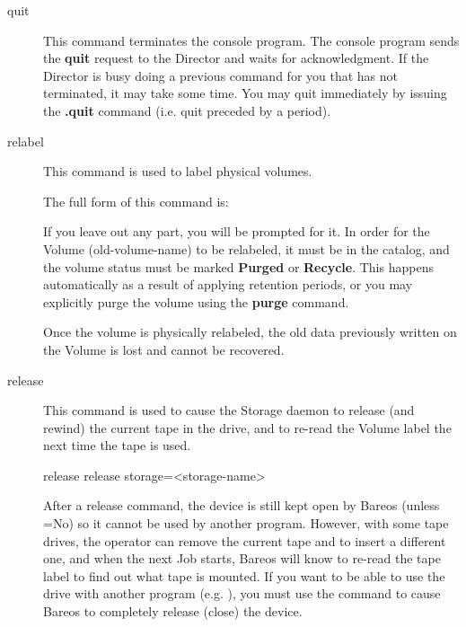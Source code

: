 \begin{description}
\item [quit]
   This command terminates the console program. The  console program sends the
   {\bf quit} request to the Director  and waits for acknowledgment. If the
   Director is busy doing  a previous command for you that has not terminated, it
   may  take some time. You may quit immediately by issuing the  {\bf .quit}
   command (i.e. quit preceded by a period).

\item [relabel]
   This command is used to label physical volumes.

   The full form of this command is:

\begin{bconsole}{relabel}
relabel storage=<storage-name> oldvolume=<old-volume-name> volume=<newvolume-name>}
\end{bconsole}

   If you leave out any part, you will be prompted for it.  In order for
   the Volume (old-volume-name) to be relabeled, it must be in the catalog,
   and the volume status must be marked {\bf Purged} or {\bf Recycle}.
   This happens automatically as a result of applying retention periods, or
   you may explicitly purge the volume using the {\bf purge} command.

   Once the volume is physically relabeled, the old data previously written
   on the Volume is lost and cannot be recovered.

\item [release]
   This command is used to cause the Storage daemon to release (and rewind) the
   current tape in the drive, and to re-read the Volume label the next time
   the tape is used.

\begin{bconsole}{release}
release storage=<storage-name>
\end{bconsole}

   After a release command, the device is still kept open by Bareos (unless
   =No) so it
   cannot be used by another program.  However, with some tape drives, the
   operator can remove the current tape and to insert a different one, and
   when the next Job starts, Bareos will know to re-read the tape label to
   find out what tape is mounted.  If you want to be able to use the drive
   with another program (e.g.  ), you must use the 
   command to cause Bareos to completely release (close) the device.


\end{description}
